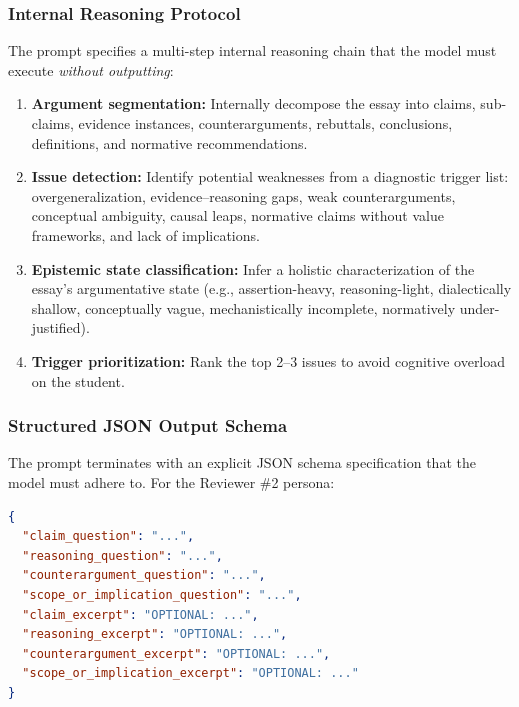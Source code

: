 \documentclass[11pt,a4paper]{article}
\begin{document}
\subsubsection{Internal Reasoning Protocol}

The prompt specifies a multi-step internal reasoning chain that the model must execute \textit{without outputting}:

\begin{enumerate}
    \item \textbf{Argument segmentation:} Internally decompose the essay into claims, sub-claims, evidence instances, counterarguments, rebuttals, conclusions, definitions, and normative recommendations.

    \item \textbf{Issue detection:} Identify potential weaknesses from a diagnostic trigger list: overgeneralization, evidence--reasoning gaps, weak counterarguments, conceptual ambiguity, causal leaps, normative claims without value frameworks, and lack of implications.

    \item \textbf{Epistemic state classification:} Infer a holistic characterization of the essay's argumentative state (e.g., assertion-heavy, reasoning-light, dialectically shallow, conceptually vague, mechanistically incomplete, normatively under-justified).

    \item \textbf{Trigger prioritization:} Rank the top 2--3 issues to avoid cognitive overload on the student.
\end{enumerate}

\subsubsection{Structured JSON Output Schema}

The prompt terminates with an explicit JSON schema specification that the model must adhere to. For the Reviewer \#2 persona:

\begin{lstlisting}[language=json, caption={Required JSON output schema for the Reviewer \#2 persona.}, label={lst:schema}]
{
  "claim_question": "...",
  "reasoning_question": "...",
  "counterargument_question": "...",
  "scope_or_implication_question": "...",
  "claim_excerpt": "OPTIONAL: ...",
  "reasoning_excerpt": "OPTIONAL: ...",
  "counterargument_excerpt": "OPTIONAL: ...",
  "scope_or_implication_excerpt": "OPTIONAL: ..."
}
\end{lstlisting}
\end{document}
